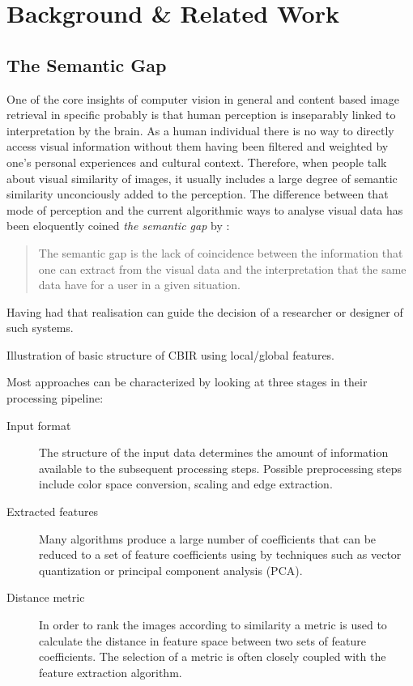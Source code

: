 \chapter{Background \& Related Work}\label{ch:background}

\section{The Semantic Gap}
One of the core insights of computer vision in general and content based image
retrieval in specific probably is that human perception is inseparably linked
to interpretation by the brain. As a human individual there is no way to
directly access visual information without them having been filtered and
weighted by one's personal experiences and cultural context. Therefore, when
people talk about visual similarity of images, it usually includes a large
degree of semantic similarity unconciously added to the perception. The
difference between that mode of perception and the current algorithmic ways to
analyse visual data has been eloquently coined \emph{the semantic gap} by
\autocite{smeulders_content-based_2000}:

\begin{quote}
The semantic gap is the lack of coincidence between the information that one
can extract from the visual data and the interpretation that the same data have
for a user in a given situation.
\end{quote}

Having had that realisation can guide the decision of a researcher or designer
of such systems.

Illustration of basic structure of CBIR using local/global features.

Most approaches can be characterized by looking at three stages in their processing pipeline:

\begin{description}
    \item[Input format] The structure of the input data determines the amount of information available to the subsequent processing steps. Possible preprocessing steps include color space conversion, scaling and edge extraction.
    \item[Extracted features] Many algorithms produce a large number of coefficients that can be reduced to a set of feature coefficients using by techniques such as vector quantization or principal component analysis (PCA).
    \item[Distance metric] In order to rank the images according to similarity a metric is used to calculate the distance in feature space between two sets of feature coefficients. The selection of a metric is often closely coupled with the feature extraction algorithm.
\end{description}

